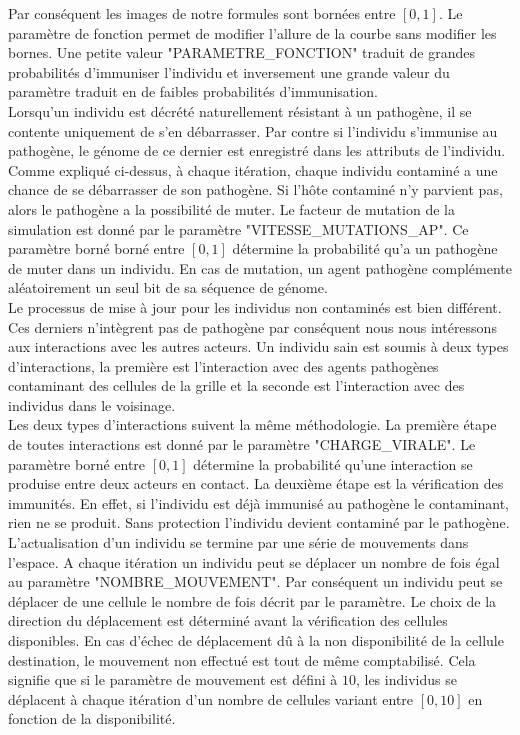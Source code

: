 Par conséquent les images de notre formules sont bornées entre $[0,1]$. Le paramètre de fonction permet de modifier l'allure de la courbe sans modifier les bornes. Une petite valeur "PARAMETRE\_FONCTION" traduit de grandes probabilités d'immuniser l'individu et inversement une grande valeur du paramètre traduit en de faibles probabilités d'immunisation.\\

Lorsqu'un individu est décrété naturellement résistant à un pathogène, il se contente uniquement de s'en débarrasser. Par contre si l'individu s'immunise au pathogène, le génome de ce dernier est enregistré dans les attributs de l'individu.\\ 

Comme expliqué ci-dessus, à chaque itération, chaque individu contaminé a une chance de se débarrasser de son pathogène. Si l'hôte contaminé n'y parvient pas, alors le pathogène a la possibilité de muter. Le facteur de mutation de la simulation est donné par le paramètre "VITESSE\_MUTATIONS\_AP". Ce paramètre borné borné entre $[0,1]$ détermine la probabilité qu'a un pathogène de muter dans un individu. En cas de mutation, un agent pathogène complémente aléatoirement un seul bit de sa séquence de génome.\\

Le processus de mise à jour pour les individus non contaminés est bien différent. Ces derniers n'intègrent pas de pathogène par conséquent nous nous intéressons aux interactions avec les autres acteurs. Un individu sain est soumis à deux types d'interactions, la première est l'interaction avec des agents pathogènes contaminant des cellules de la grille et la seconde est l’interaction avec des individus dans le voisinage.\\

Les deux types d'interactions suivent la même méthodologie. La première étape de toutes interactions est donné par le paramètre "CHARGE\_VIRALE". Le paramètre borné entre $[0,1]$ détermine la probabilité qu'une interaction se produise entre deux acteurs en contact. La deuxième étape est la vérification des immunités. En effet, si l'individu est déjà immunisé au pathogène le contaminant, rien ne se produit. Sans protection l'individu devient contaminé par le pathogène.\\

L'actualisation d'un individu se termine par une série de mouvements dans l'espace. A chaque itération un individu peut se déplacer un nombre de fois égal au paramètre "NOMBRE\_MOUVEMENT". Par conséquent un individu peut se déplacer de une cellule le nombre de fois décrit par le paramètre. Le choix de la direction du déplacement est déterminé avant la vérification des cellules disponibles. En cas d'échec de déplacement dû à la non disponibilité de la cellule destination, le mouvement non effectué est tout de même comptabilisé. Cela signifie que si le paramètre de mouvement est défini à $10$, les individus se déplacent à chaque itération d'un nombre de cellules variant entre $[0,10]$ en fonction de la disponibilité.\\

